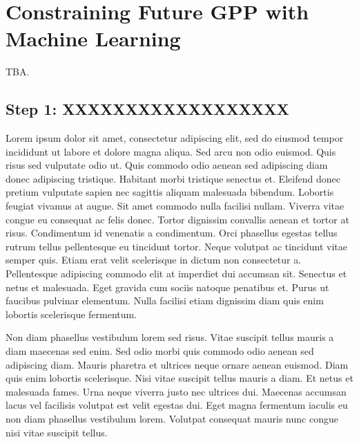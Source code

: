 


\chapter{Constraining Future \acl{GPP} with Machine Learning}
\label{ch:06:paper_gpp}

TBA.


\section{Step 1: XXXXXXXXXXXXXXXXXX}
\label{sec:06:step_1}

Lorem ipsum dolor sit amet, consectetur adipiscing elit, sed do eiusmod tempor
incididunt ut labore et dolore magna aliqua. Sed arcu non odio euismod. Quis
risus sed vulputate odio ut. Quis commodo odio aenean sed adipiscing diam donec
adipiscing tristique. Habitant morbi tristique senectus et. Eleifend donec
pretium vulputate sapien nec sagittis aliquam malesuada bibendum. Lobortis
feugiat vivamus at augue. Sit amet commodo nulla facilisi nullam. Viverra vitae
congue eu consequat ac felis donec. Tortor dignissim convallis aenean et tortor
at risus. Condimentum id venenatis a condimentum. Orci phasellus egestas tellus
rutrum tellus pellentesque eu tincidunt tortor. Neque volutpat ac tincidunt
vitae semper quis. Etiam erat velit scelerisque in dictum non consectetur a.
Pellentesque adipiscing commodo elit at imperdiet dui accumsan sit. Senectus et
netus et malesuada. Eget gravida cum sociis natoque penatibus et. Purus ut
faucibus pulvinar elementum. Nulla facilisi etiam dignissim diam quis enim
lobortis scelerisque fermentum.

Non diam phasellus vestibulum lorem sed risus. Vitae suscipit tellus mauris a
diam maecenas sed enim. Sed odio morbi quis commodo odio aenean sed adipiscing
diam. Mauris pharetra et ultrices neque ornare aenean euismod. Diam quis enim
lobortis scelerisque. Nisi vitae suscipit tellus mauris a diam. Et netus et
malesuada fames. Urna neque viverra justo nec ultrices dui. Maecenas accumsan
lacus vel facilisis volutpat est velit egestas dui. Eget magna fermentum
iaculis eu non diam phasellus vestibulum lorem. Volutpat consequat mauris nunc
congue nisi vitae suscipit tellus.

